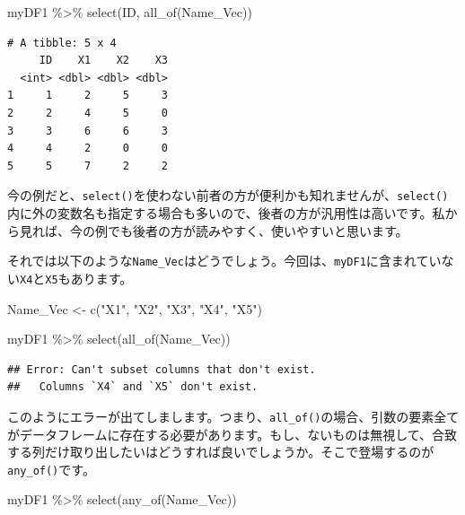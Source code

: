 \documentclass[
  a4paper,
  pandoc,
  ja=standard,
  jafont=haranoaji]{bxjsbook}
\newenvironment{Shaded}{\begin{snugshade}}{\end{snugshade}}
\newcommand{\FunctionTok}[1]{\textcolor[rgb]{0.28,0.35,0.67}{#1}}
\newcommand{\NormalTok}[1]{\textcolor[rgb]{0.00,0.48,0.65}{#1}}
\newcommand{\OtherTok}[1]{\textcolor[rgb]{0.00,0.48,0.65}{#1}}
\newcommand{\SpecialCharTok}[1]{\textcolor[rgb]{0.37,0.37,0.37}{#1}}
\newcommand{\StringTok}[1]{\textcolor[rgb]{0.13,0.47,0.30}{#1}}
\begin{document}
\begin{Shaded}
\begin{Highlighting}[numbers=left,,]
\NormalTok{myDF1 }\SpecialCharTok{\%\textgreater{}\%}
  \FunctionTok{select}\NormalTok{(ID, }\FunctionTok{all\_of}\NormalTok{(Name\_Vec))}
\end{Highlighting}
\end{Shaded}

\begin{verbatim}
# A tibble: 5 x 4
     ID    X1    X2    X3
  <int> <dbl> <dbl> <dbl>
1     1     2     5     3
2     2     4     5     0
3     3     6     6     3
4     4     2     0     0
5     5     7     2     2
\end{verbatim}

今の例だと、\texttt{select()}を使わない前者の方が便利かも知れませんが、\texttt{select()}内に外の変数名も指定する場合も多いので、後者の方が汎用性は高いです。私から見れば、今の例でも後者の方が読みやすく、使いやすいと思います。

それでは以下のような\texttt{Name\_Vec}はどうでしょう。今回は、\texttt{myDF1}に含まれていない\texttt{X4}と\texttt{X5}もあります。

\begin{Shaded}
\begin{Highlighting}[numbers=left,,]
\NormalTok{Name\_Vec }\OtherTok{\textless{}{-}} \FunctionTok{c}\NormalTok{(}\StringTok{"X1"}\NormalTok{, }\StringTok{"X2"}\NormalTok{, }\StringTok{"X3"}\NormalTok{, }\StringTok{"X4"}\NormalTok{, }\StringTok{"X5"}\NormalTok{)}

\NormalTok{myDF1 }\SpecialCharTok{\%\textgreater{}\%}
  \FunctionTok{select}\NormalTok{(}\FunctionTok{all\_of}\NormalTok{(Name\_Vec))}
\end{Highlighting}
\end{Shaded}

\begin{verbatim}
## Error: Can't subset columns that don't exist.
##   Columns `X4` and `X5` don't exist.
\end{verbatim}

このようにエラーが出てしまします。つまり、\texttt{all\_of()}の場合、引数の要素全てがデータフレームに存在する必要があります。もし、ないものは無視して、合致する列だけ取り出したいはどうすれば良いでしょうか。そこで登場するのが\texttt{any\_of()}です。

\begin{Shaded}
\begin{Highlighting}[numbers=left,,]
\NormalTok{myDF1 }\SpecialCharTok{\%\textgreater{}\%}
  \FunctionTok{select}\NormalTok{(}\FunctionTok{any\_of}\NormalTok{(Name\_Vec))}
\end{Highlighting}
\end{Shaded}
\end{document}
